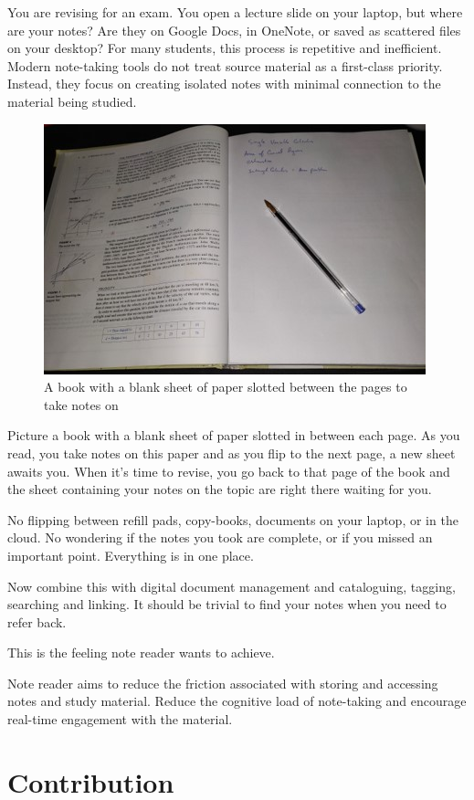 You are revising for an exam. You open a lecture slide on your laptop, but where are your notes? Are they on Google Docs, in OneNote, or saved as scattered files on your desktop? For many students, this process is repetitive and inefficient. Modern note-taking tools do not treat source material as a first-class priority. Instead, they focus on creating isolated notes with minimal connection to the material being studied.

\begin{figure}
    \centering
    \includegraphics[width=0.5\linewidth]{Figures/book.jpg}
    \caption{A book with a blank sheet of paper slotted between the pages to take notes on}
    \label{fig:enter-label}
\end{figure}

Picture a book with a blank sheet of paper slotted in between each page. As you read, you take notes on this paper and as you flip to the next page, a new sheet awaits you. When it’s time to revise, you go back to that page of the book and the sheet containing your notes on the topic are right there waiting for you.  

No flipping between refill pads, copy-books, documents on your laptop, or in the cloud. No wondering if the notes you took are complete, or if you missed an important point. Everything is in one place. 

Now combine this with digital document management and cataloguing, tagging, searching and linking. It should be trivial to find your notes when you need to refer back. 

This is the feeling note reader wants to achieve. 

Note reader aims to reduce the friction associated with storing and accessing notes and study material. Reduce the cognitive load of note-taking and encourage real-time engagement with the material. 

\section{Contribution}

